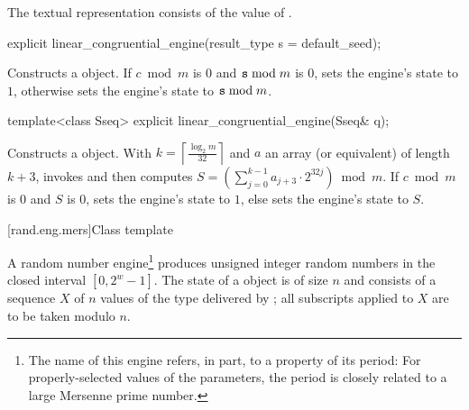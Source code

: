 \pnum The textual representation%
consists of
the value of .

%
\begin{itemdecl}
explicit linear_congruential_engine(result_type s = default_seed);
\end{itemdecl}

\begin{itemdescr}
\pnum\effects Constructs a  object.
 If $c \bmod m$ is $0$ and $\texttt{s} \bmod m$ is $0$,
 sets the engine's state to $1$,
 otherwise sets the engine's state to $\texttt{s} \bmod m$.
\end{itemdescr}

%
\begin{itemdecl}
template<class Sseq> explicit linear_congruential_engine(Sseq& q);
\end{itemdecl}

\begin{itemdescr}
\pnum\effects Constructs a  object.
 With
 $k = \left\lceil \frac{\log_2 m}{32} \right\rceil$
 and $a$ an array (or equivalent)
 of length $k + 3$,
 invokes 
 and then computes
 $S = \left(\sum_{j = 0}^{k - 1} a_{j + 3} \cdot 2^{32j} \right) \bmod m$.
 If $c \bmod m$ is $0$ and $S$ is $0$,
 sets the engine's state to $1$,
 else sets the engine's state
 to $S$.
\end{itemdescr}


[rand.eng.mers]{Class template }%
%

\pnum
A  random number
engine\footnote{The name of this engine refers, in part, to a property of its period:
 For properly-selected values of the parameters,
 the period is closely related to a large Mersenne prime number.}
produces unsigned integer random numbers
in the closed interval $[0,2^w-1]$.
The
%
%
state
of a  object 
is of size $n$
and consists of a sequence $X$
of $n$ values of the type delivered by ;
all subscripts applied to $X$ are to be taken modulo $n$.

